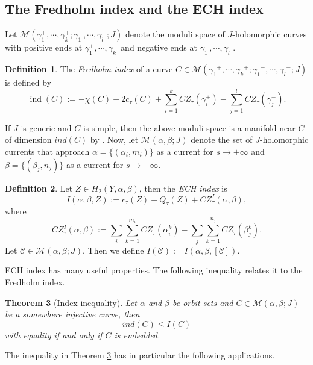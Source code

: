 \documentclass{article}
\numberwithin{equation}{section}
\newtheorem{theorem}{Theorem}[section]
\theoremstyle{definition}
\newtheorem{definition}[theorem]{Definition}
\newcommand{\ind}{\operatorname{ind}}
\begin{document}
\subsection{The Fredholm index and the ECH index}

Let $\mathcal{M}(\gamma_1^+, \cdots, \gamma_k^+; \gamma_1^-, \cdots, \gamma_l^-; J)$ denote the moduli space of $J$-holomorphic curves with positive ends at $\gamma_1^+, \cdots, \gamma_k^+$ and negative ends at $\gamma_1^-, \cdots, \gamma_l^-$. 
\begin{definition}
    The \emph{Fredholm index} of a curve $C\in \mathcal{M}({\gamma_1}^+, \cdots, {\gamma_k}^+; {\gamma_1}^-, \cdots, {\gamma_l}^-; J)$ is defined by 
    $$\ind(C) := -\chi(C) + 2c_{\tau}(C) + \sum_{i=1}^k CZ_{\tau}(\gamma_{i}^+) - \sum_{j=1}^l CZ_{\tau}(\gamma_{j}^-).$$
\end{definition}

If $J$ is generic and $C$ is simple, then the above moduli space is a manifold near $C$ of dimension $ind(C)$ by \cite{Dragnev}. Now, let $\mathcal{M}(\alpha,\beta;J)$ denote the set of $J$-holomorphic currents that approach $\alpha = \{(\alpha_i, m_i)\}$ as a current for $s\rightarrow +\infty$ and $\beta = \{(\beta_j, n_j)\}$ as a current for $s\rightarrow -\infty$.

\begin{definition}
\label{def:ECHindex}
Let $Z\in H_2(Y, \alpha, \beta)$, then the \emph{ECH index} is
$$I(\alpha, \beta, Z) := c_{\tau}(Z) + Q_{\tau}(Z) + CZ^I_{\tau}(\alpha, \beta),$$
where
$$CZ^I_{\tau}(\alpha, \beta) := \sum_i\sum_{k=1}^{m_i} CZ_{\tau}(\alpha_i^k) - \sum_j \sum_{k=1}^{n_j} CZ_{\tau}(\beta_j^k).$$
Let $\mathcal{C}\in \mathcal{M}(\alpha, \beta; J)$. Then we define $I(\mathcal{C}) := I(\alpha, \beta, [\mathcal{C}])$.
\end{definition}



ECH index has many useful properties. The following inequality relates it to the Fredholm index.

\begin{theorem}[Index inequality]\cite[Theorem 4.15]{Hutchings_index_revisited}
\label{thm:index_inequality}
Let $\alpha$ and $\beta$ be orbit sets and $C\in \mathcal{M}(\alpha, \beta; J)$ be a somewhere injective curve, then
$$ind(C)\leq I(C)$$
with equality if and only if $C$ is embedded.
\end{theorem}


The inequality in Theorem \ref{thm:index_inequality} has in particular the following applications.
\end{document}
